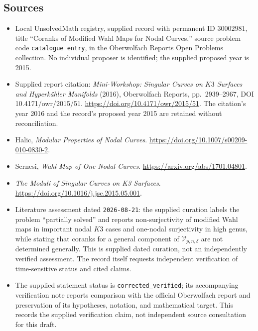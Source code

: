 \documentclass[11pt]{article}
\begin{document}
\subsection{Sources}
\begin{itemize}
\item Local UnsolvedMath registry, supplied record with permanent ID \(30002981\), title ``Coranks of Modified Wahl Maps for Nodal Curves,'' source problem code \texttt{catalogue entry}, in the Oberwolfach Reports Open Problems collection. No individual proposer is identified; the supplied proposed year is 2015.
\item Supplied report citation: \emph{Mini-Workshop: Singular Curves on \(K3\) Surfaces and Hyperkähler Manifolds} (2016), Oberwolfach Reports, pp.\ 2939--2967, DOI 10.4171/owr/2015/51. \url{https://doi.org/10.4171/owr/2015/51}. The citation's year 2016 and the record's proposed year 2015 are retained without reconciliation.
\item Halic, \emph{Modular Properties of Nodal Curves}. \url{https://doi.org/10.1007/s00209-010-0830-2}.
\item Sernesi, \emph{Wahl Map of One-Nodal Curves}. \url{https://arxiv.org/abs/1701.04801}.
\item \emph{The Moduli of Singular Curves on K3 Surfaces}. \url{https://doi.org/10.1016/j.jsc.2015.05.001}.
\item Literature assessment dated \texttt{2026-08-21}: the supplied curation labels the problem ``partially solved'' and reports non-surjectivity of modified Wahl maps in important nodal \(K3\) cases and one-nodal surjectivity in high genus, while stating that coranks for a general component of \(\mathcal V_{p,n,\delta}\) are not determined generally. This is supplied dated curation, not an independently verified assessment. The record itself requests independent verification of time-sensitive status and cited claims.
\item The supplied statement status is \texttt{corrected\_verified}; its accompanying verification note reports comparison with the official Oberwolfach report and preservation of its hypotheses, notation, and mathematical target. This records the supplied verification claim, not independent source consultation for this draft.
\end{itemize}
\end{document}
